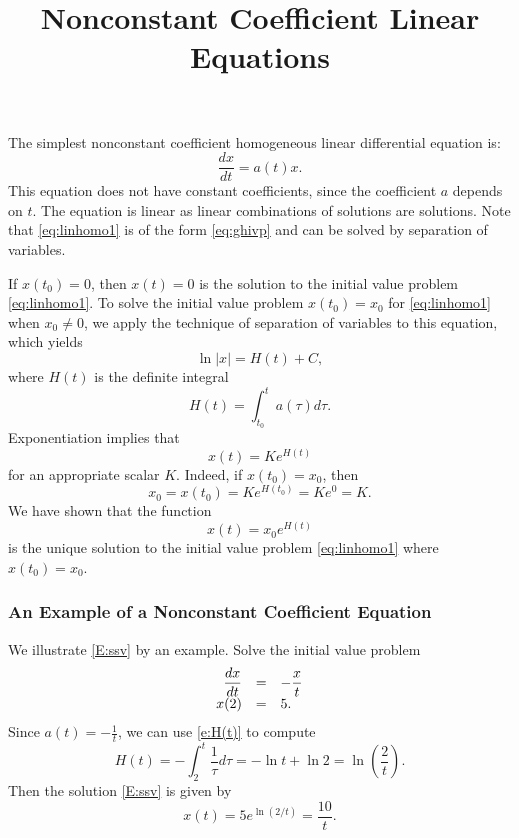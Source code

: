 \documentclass{ximera}
\title{Nonconstant Coefficient Linear Equations}
\begin{document}
\begin{abstract}
\end{abstract}
\maketitle


\label{sec:VarConstS}

The simplest nonconstant coefficient homogeneous 
linear differential equation is:
\begin{equation}   \label{eq:linhomo1}
\frac{dx}{dt}  =  a(t)x.
\end{equation}
This equation does not have constant coefficients, since the coefficient 
$a$ depends on $t$.  The equation is linear as linear combinations of 
solutions are solutions.  Note that \eqref{eq:linhomo1} is of the form 
\eqref{eq:ghivp} and can be solved by separation of variables. 

If $x(t_0)=0$, then $x(t)=0$ is the solution to the initial value problem
\eqref{eq:linhomo1}.
To solve the initial value problem $x(t_0)=x_0$ for \eqref{eq:linhomo1}
when $x_0\neq 0$, we apply the technique of separation of variables to 
this equation, which yields
\[
\ln|x| = H(t) + C,
\]
where $H(t)$ is the definite integral
\begin{equation}   \label{e:H(t)}
H(t)=\int_{t_0}^t a(\tau)d\tau.
\end{equation}
Exponentiation implies that
\[
x(t) = Ke^{H(t)}
\]
for an appropriate scalar $K$.  Indeed, if $x(t_0)=x_0$, then
\[
x_0 = x(t_0) = Ke^{H(t_0)} = Ke^0 = K.
\]
We have shown that the function 
\begin{equation} \label{E:ssv}
x(t) = x_0 e^{H(t)}
\end{equation}
is the unique solution 
to the initial value problem 
\eqref{eq:linhomo1} where $x(t_0)=x_0$.

\subsubsection*{An Example of a Nonconstant Coefficient Equation}

We illustrate \eqref{E:ssv} by an example. Solve the initial value problem
\[
\begin{array}{rcl}
\displaystyle \frac{dx}{dt} & = & -\displaystyle \frac{x}{t} \\
x(2) & = & 5.
\end{array}
\]
Since $a(t)=-\frac{1}{t}$, we can use \eqref{e:H(t)} to compute
\[
H(t)=-\int_2^t \frac{1}{\tau}d\tau = -\ln t +\ln 2 =
\ln\left(\frac{2}{t}\right).
\]
Then the solution \eqref{E:ssv} is given by
\[
x(t) = 5 e^{\ln(2/t)} = \frac{10}{t}.
\]
\end{document}
